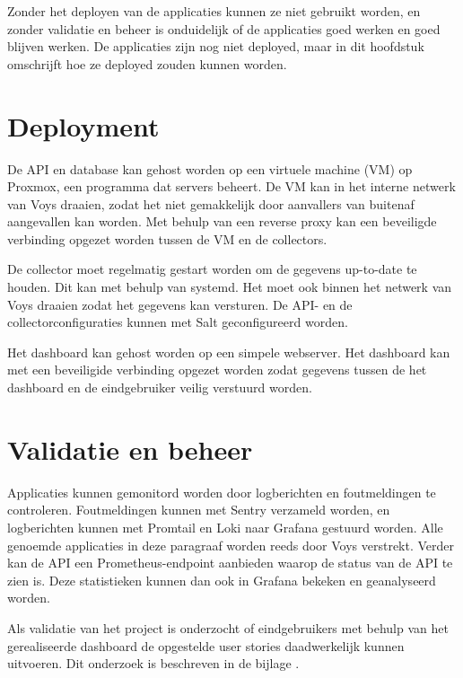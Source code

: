 \documentclass[../report.tex]{subfiles}
\begin{document}
Zonder het deployen van de applicaties kunnen ze niet gebruikt worden, en zonder validatie en beheer is onduidelijk of de applicaties goed werken en goed blijven werken. De applicaties zijn nog niet deployed, maar in dit hoofdstuk omschrijft hoe ze deployed zouden kunnen worden.

\section{Deployment}

De \gls*{API} en database kan gehost worden op een virtuele machine (VM) op Proxmox, een programma dat servers beheert. De VM kan in het interne netwerk van Voys draaien, zodat het niet gemakkelijk door aanvallers van buitenaf aangevallen kan worden. Met behulp van een reverse proxy kan een beveiligde verbinding opgezet worden tussen de VM en de collectors.

De collector moet regelmatig gestart worden om de gegevens up-to-date te houden. Dit kan met behulp van systemd. Het moet ook binnen het netwerk van Voys draaien zodat het gegevens kan versturen. De \gls*{API}- en de collectorconfiguraties kunnen met \gls*{Salt} geconfigureerd worden.

Het dashboard kan gehost worden op een simpele webserver. Het dashboard kan met een beveiligide verbinding opgezet worden zodat gegevens tussen de het dashboard en de eindgebruiker veilig verstuurd worden.

\section{Validatie en beheer}

Applicaties kunnen gemonitord worden door logberichten en foutmeldingen te controleren. Foutmeldingen kunnen met Sentry verzameld worden, en logberichten kunnen met Promtail en Loki naar Grafana gestuurd worden. Alle genoemde applicaties in deze paragraaf worden reeds door Voys verstrekt. Verder kan de \gls*{API} een Prometheus-endpoint aanbieden waarop de status van de API te zien is. Deze statistieken kunnen dan ook in Grafana bekeken en geanalyseerd worden.

Als validatie van het project is onderzocht of eindgebruikers met behulp van het gerealiseerde dashboard de opgestelde user stories daadwerkelijk kunnen uitvoeren. Dit onderzoek is beschreven in de bijlage \parencite{research_report}.
\end{document}
